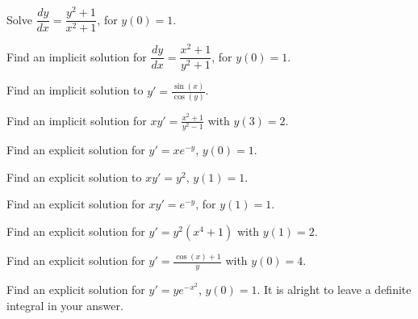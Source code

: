 \documentclass{ximera}
\begin{document}
\begin{exercise}
    Solve $\dfrac{dy}{dx} = \dfrac{y^2+1}{x^2+1}$, for $y(0) = 1$.
\end{exercise}

\begin{exercise}
    Find an implicit solution for $\dfrac{dy}{dx} = \dfrac{x^2+1}{y^2+1}$, for $y(0) = 1$.
\end{exercise}

\begin{exercise}%
    Find an implicit solution to $y' = \frac{\sin(x)}{\cos(y)}$.
\end{exercise}

\begin{exercise}
    Find an implicit solution for $xy' = \frac{x^2 + 1}{y^2 - 1}$ with $y(3) = 2$.
\end{exercise}

\begin{exercise}
    Find an explicit solution for $y' = xe^{-y}$, $y(0)=1$.
\end{exercise}

\begin{exercise}%
    Find an explicit solution to $x y' = y^2$, $y(1) = 1$.
\end{exercise}

\begin{exercise}
    Find an explicit solution for $xy' = e^{-y}$, for $y(1)=1$.
\end{exercise}

\begin{exercise}
    Find an explicit solution for $y' = y^2(x^4 + 1)$ with $y(1) = 2$. 
\end{exercise}

\begin{exercise}
    Find an explicit solution for $y' = \frac{\cos(x)+ 1}{y}$ with $y(0) = 4$. 
\end{exercise}

\begin{exercise}
    Find an explicit solution for $y' = ye^{-x^2}$, $y(0)=1$.  It is alright to leave a definite integral in your answer.
\end{exercise}
\end{document}
